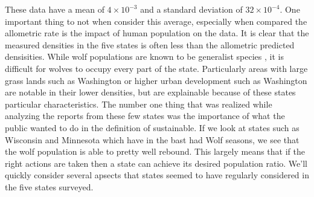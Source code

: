 \documentclass[12pt]{article}
\begin{document}
These data have a mean of $4 \times 10^{-3}$ and a standard deviation of $32 \times 10^{-4}$.
One important thing to not when consider this average, 
especially when compared the allometric rate is the impact of human population on the data.
It is clear that the measured densities in the five states is often less than the allometric predicted densisities.
While wolf populations are known to be generalist species \cite{WPWA},
it is difficult for wolves to occupy every part of the state.
Particularly areas with large grass lands such as Washington or higher urban development such as Washington 
are notable in their lower densities, but are explainable because of these states particular characteristics. 
The number one thing that was realized while analyzing the reports from these few states was the importance of what the public wanted 
to do in the definition of sustainable.
If we look at states such as Wisconsin and Minnesota which have in the bast had Wolf seasons,
we see that the wolf population is able to pretty well rebound.
This largely means that if the right actions are taken then a state can achieve its desired population ratio.
We'll quickly consider several apsects that states seemed to have regularly considered in the five states surveyed.
\end{document}

